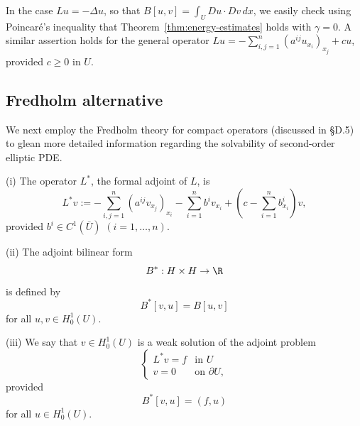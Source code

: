 \begin{example}
\label{ex:energy-estimates-gamma-zero-examples}
In the case $Lu = -\Delta u$, so that $B[u,v] = \int_U Du \cdot Dv\,dx$, we easily check using Poincar\'e's inequality that Theorem~\ref{thm:energy-estimates} holds with $\gamma = 0$. A similar assertion holds for the general operator $Lu = -\sum_{i,j=1}^n(a^{ij}u_{x_i})_{x_j} + cu$, provided $c \geq 0$ in $U$.
\end{example}

\subsection{Fredholm alternative}

We next employ the Fredholm theory for compact operators (discussed in \S D.5) to glean more detailed information regarding the solvability of second-order elliptic PDE.

\begin{definition}
\label{def:formal-adjoint-operator}
(i) The operator $L^*$, the formal adjoint of $L$, is
$$L^*v := -\sum_{i,j=1}^n(a^{ij}v_{x_j})_{x_i} - \sum_{i=1}^n b^iv_{x_i} + \left(c - \sum_{i=1}^n b^i_{x_i}\right)v,$$
provided $b^i \in C^1(\bar U)$ $(i=1,\ldots,n)$.

(ii) The adjoint bilinear form
$$B^* : H \times H \to \R$$
is defined by
$$B^*[v,u] = B[u,v]$$
for all $u,v \in H_0^1(U)$.

(iii) We say that $v \in H_0^1(U)$ is a weak solution of the adjoint problem
$$\begin{cases} L^*v = f & \text{in } U \\ v = 0 & \text{on } \partial U, \end{cases}$$
provided
$$B^*[v,u] = (f,u)$$
for all $u \in H_0^1(U)$.
\end{definition}


